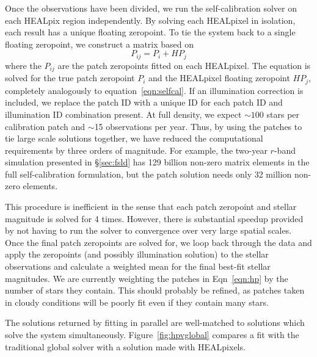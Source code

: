 \documentclass[12pt,preprint]{aastex}
\begin{document}
Once the observations have been divided, we run the self-calibration solver on each HEALpix region independently.  By solving each HEALpixel in isolation, each result has a unique floating zeropoint.  To tie the system back to a single floating zeropoint, we construct a matrix based on
\begin{equation}\label{eqn:hp}
P_{ij} = P_{i} + HP_{j}
\end{equation}
where the $P_{ij}$ are the patch zeropoints fitted on each HEALpixel.  The equation is solved for the true patch zeropoint $P_{i}$ and the HEALpixel floating zeropoint $HP_{j}$, completely analogously to equation~\ref{eqn:selfcal}.  If an illumination correction is included, we replace the patch ID with a unique ID for each patch ID and illumination ID combination present.  At full density, we expect $\sim100$ stars per calibration patch and $\sim$15 observations per year.  Thus, by using the patches to tie large scale solutions together, we have reduced the computational requirements by three orders of magnitude.  For example, the two-year $r$-band simulation presented in \S\ref{sec:fsld} has 129 billion non-zero matrix elements in the full self-calibration formulation, but the patch solution needs only 32 million non-zero elements.  

This procedure is inefficient in the sense that each patch zeropoint and stellar magnitude is solved for 4 times.  However, there is substantial speedup provided by not having to run the solver to convergence over very large spatial scales.  Once the final patch zeropoints are solved for, we loop back through the data and apply the zeropoints (and possibly illumination solution) to the stellar observations and calculate a weighted mean for the final best-fit stellar magnitudes.  We are currently weighting the patches in Eqn~\ref{eqn:hp} by the number of stars they contain.  This should probably be refined, as patches taken in cloudy conditions will be poorly fit even if they contain many stars.  

The solutions returned by fitting in parallel are well-matched to solutions which solve the system simultaneously.  Figure~\ref{fig:hpvglobal} compares a fit with the traditional global solver with a solution made with HEALpixels.  

\end{document}
